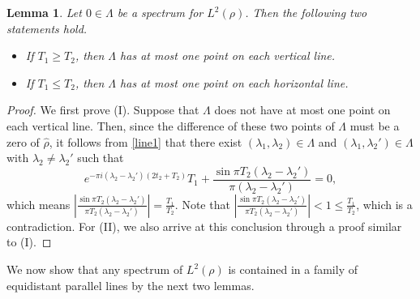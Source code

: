 \documentclass[12pt,a4paper,intlimits,sumlimits]{amsart}
\theoremstyle{plain}
\newtheorem{lemma}{Lemma}
\theoremstyle{definition}
\newcommand{\Abs}[1]{{\left|{#1}\right|}}
\newcommand{\ft}[1]{\widehat{#1}}
\newcounter{rem}
\begin{document}
\begin{lemma}\label{lemtwo-l--1}
Let $0\in\Lambda$ be a spectrum for $L^2(\rho)$. Then the following two statements hold.
\begin{itemize}
\item[(I)]
  If $T_1\geq T_2$, then  $\Lambda$  has at most one point on each vertical line.
  \item[(II)]  If $T_1\leq T_2$, then  $\Lambda$  has at most one point on each horizontal line.
  \end{itemize}
\end{lemma}
\begin{proof}
We first prove (I). Suppose that $\Lambda $ does not have   at most one point on each vertical line. Then, since the difference of these two points of $\Lambda$ must be a zero of $\ft{\rho}$, it follows from \eqref{line1} that there exist  $(\lambda_1, \lambda_2)\in\Lambda$ and $(\lambda_1, \lambda_2')\in\Lambda$ with $\lambda_2\neq\lambda_2'$ such that
$$ e^{-\pi i(\lambda_2-\lambda_2')\left(2 t_2+T_2\right)  }    T_1 +\frac{\sin \pi T_2(\lambda_2-\lambda_2')}{\pi (\lambda_2-\lambda_2')}=0,$$
which means $\Abs{\frac{\sin \pi T_2(\lambda_2-\lambda_2')}{\pi T_2(\lambda_2-\lambda_2')}}=\frac{T_1 }{T_2}$. Note that $\Abs{\frac{\sin \pi T_2(\lambda_2-\lambda_2')}{\pi T_2(\lambda_2-\lambda_2')}}<1\leq\frac{T_1}{T_2}$,  which is a  contradiction.
For (II), we also arrive at this conclusion through a proof similar to (I).

\end{proof}
 We now show that any spectrum of $L^2(\rho)$ is contained in a family of equidistant parallel lines by the next two lemmas.
 
\end{document}
